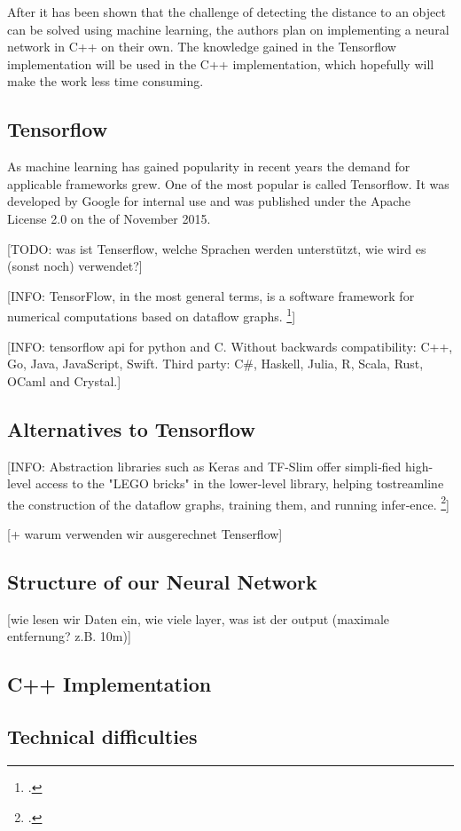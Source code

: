After it has been shown that the challenge of detecting the distance to an object can be solved using machine learning, the authors plan on implementing a neural network in C++ on their own. The knowledge gained in the Tensorflow implementation will be used in the C++ implementation, which hopefully will make the work less time consuming.

\subsection{Tensorflow}
As machine learning has gained popularity in recent years the demand for applicable frameworks grew. One of the most popular is called Tensorflow. It was developed by Google for internal use and was published under the Apache License 2.0 on the  of November 2015.

[TODO: was ist Tenserflow, welche Sprachen werden unterstützt, wie wird es (sonst noch) verwendet?]

[INFO: TensorFlow,  in  the  most  general  terms,  is  a  software  framework  for  numerical  computations based on dataflow graphs. \footcite[page 6]{Hope_Learning_TensorFlow}]

[INFO: tensorflow api for python and C. Without backwards compatibility: C++, Go, Java, JavaScript, Swift. Third party: C\#, Haskell, Julia, R, Scala, Rust, OCaml and Crystal.]

\subsection{Alternatives to Tensorflow}

[INFO: Abstraction libraries such as Keras and TF-Slim offer simpli‐fied  high-level  access  to  the  "LEGO  bricks"  in  the  lower-level  library,  helping  tostreamline the construction of the dataflow graphs, training them, and running infer‐ence. \footcite[page 7]{Hope_Learning_TensorFlow}]

[+ warum verwenden wir ausgerechnet Tenserflow]

\subsection{Structure of our Neural Network}

[wie lesen wir Daten ein, wie viele layer, was ist der output (maximale entfernung? z.B. 10m)]

\subsection{C++ Implementation}

\subsection{Technical difficulties}

\filbreak